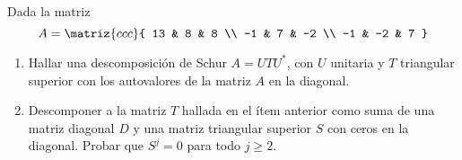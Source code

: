 \begin{enunciado}{\ejercicio}
  Dada la matriz
  $$
    A =
    \matriz{ccc}{
      13 & 8 & 8 \\
      -1 & 7 & -2 \\
      -1 & -2 & 7
    }
  $$
  \begin{enumerate}[label=(\alph*)]
    \item Hallar una descomposición de Schur $A = UTU^*$, con $U$ unitaria y $T$ triangular superior
          con los autovalores de la matriz $A$ en la diagonal.

    \item Descomponer a la matriz $T$ hallada en el ítem anterior como suma de una matriz diagonal $D$ y una matriz triangular
          superior $S$ con ceros en la diagonal. Probar que $S^j = 0$ para todo $j \geq 2$.
  \end{enumerate}
\end{enunciado}

